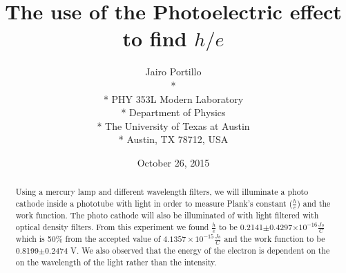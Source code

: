 \documentclass[11pt,letterpaper,onecolumn]{article}
\begin{document}

\title{\bf The use of the Photoelectric effect to find $h/e$}

\author{
 Jairo Portillo \\*
  \\*
 PHY 353L Modern Laboratory \\*
 Department of Physics \\*
 The University of Texas at Austin \\*
 Austin, TX 78712, USA
}
\date{October 26, 2015}


\maketitle


\begin{abstract}

Using a mercury lamp and different wavelength filters, we will illuminate a photo cathode inside a phototube with light in order to measure Plank's constant ($\frac{h}{e}$) and the work function. The photo cathode will also be illuminated of with light filtered with optical density filters. From this experiment we found $\frac{h}{e}$ to be 0.2141$\pm$0.4297$\times10^{-16}\frac{Js}{C}$ which is 50$\%$ from the accepted value of $4.1357\times10^{-15}\frac{Js}{C}$ and the work function to be 0.8199$\pm$0.2474 V. We also observed that the energy of the electron is dependent on the on the wavelength of the light rather than the intensity.

\end{abstract}


\end{document}
